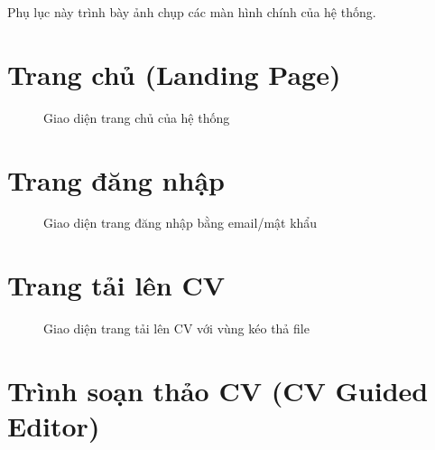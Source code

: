 \documentclass[../DoAn.tex]{subfiles}
\begin{document}
Phụ lục này trình bày ảnh chụp các màn hình chính của hệ thống.

\section{Trang chủ (Landing Page)}

\begin{figure}[H]
\centering
{}
\caption{Giao diện trang chủ của hệ thống}
\label{fig:landing}
\end{figure}

\section{Trang đăng nhập}

\begin{figure}[H]
\centering
{}
\caption{Giao diện trang đăng nhập bằng email/mật khẩu}
\label{fig:login}
\end{figure}

\section{Trang tải lên CV}

\begin{figure}[H]
\centering
{}
\caption{Giao diện trang tải lên CV với vùng kéo thả file}
\label{fig:upload}
\end{figure}

\section{Trình soạn thảo CV (CV Guided Editor)}
\end{document}
